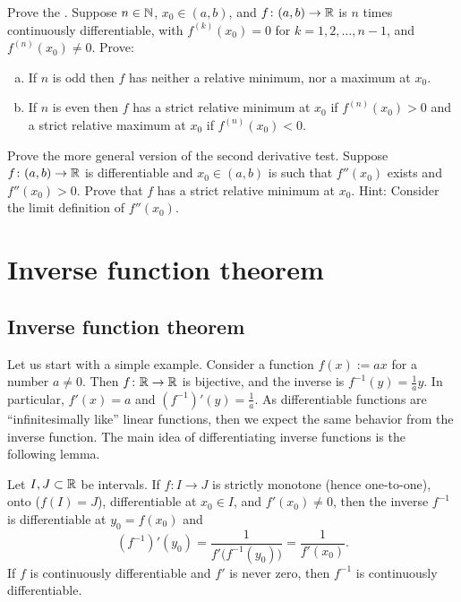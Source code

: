 \begin{exercise}
Prove the \emph{}.  Suppose $n \in {\mathbb{N}}$,
$x_0 \in (a,b)$, and $f \colon (a,b) \to {\mathbb{R}}$ is $n$ times continuously
differentiable, with $f^{(k)}(x_0) = 0$ for $k=1,2,\ldots,n-1$, and
$f^{(n)}(x_0)
\not= 0$.
Prove:
\begin{enumerate}[a)]
\item
If $n$ is odd then $f$ has neither a relative minimum,
nor a maximum at $x_0$.
\item
If $n$ is even then $f$ has a strict relative minimum at $x_0$ if
$f^{(n)}(x_0) > 0$
and a strict relative maximum at $x_0$ if $f^{(n)}(x_0) < 0$.
\end{enumerate}
\end{exercise}

\begin{exercise}
Prove the more general version of the second derivative test.
Suppose $f \colon (a,b) \to {\mathbb{R}}$ is differentiable and $x_0 \in (a,b)$
is such that $f''(x_0)$ exists and $f''(x_0) > 0$.
Prove that $f$ has a strict relative
minimum at $x_0$.  Hint: Consider the limit definition of $f''(x_0)$.
\end{exercise}


\sectionnewpage
\section{Inverse function theorem}
\label{sec:ift}


\subsection{Inverse function theorem}

Let us start with a simple example.  Consider a function $f(x) := a x$ for a
number $a \not= 0$.  Then $f \colon {\mathbb{R}} \to {\mathbb{R}}$ is bijective, and the inverse
is $f^{-1}(y) = \frac{1}{a} y$.  In particular, $f'(x) = a$ and 
$(f^{-1})'(y) = \frac{1}{a}$.  As differentiable functions are
``infinitesimally like'' linear functions, then we expect the same
behavior from the inverse function.
The main idea of differentiating inverse functions is the following lemma.

\begin{lemma} \label{lemma:ift}
Let $I,J \subset {\mathbb{R}}$ be intervals.
If $f \colon I \to J$ is strictly monotone (hence one-to-one),
onto ($f(I) = J$),
differentiable at $x_0 \in I$, and $f'(x_0) \not= 0$,
then the inverse 
$f^{-1}$ is differentiable at $y_0 = f(x_0)$ and
\begin{equation*}
(f^{-1})'(y_0) = \frac{1}{f'\bigl( f^{-1}(y_0) \bigr)} = \frac{1}{f'(x_0)} .
\end{equation*}
If $f$ is continuously differentiable and $f'$ is never zero, then $f^{-1}$
is continuously differentiable.
\end{lemma}


